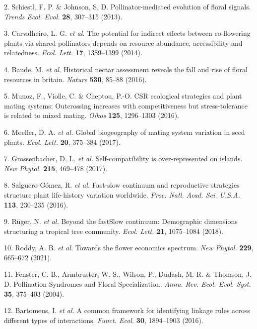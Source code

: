\documentclass[
  12pt,
  a4paper,
]{article}
\begin{document}
\leavevmode\hypertarget{ref-schiestl2013}{}%
2. Schiestl, F. P. \& Johnson, S. D. Pollinator-mediated evolution of floral signals. \emph{Trends Ecol. Evol.} \textbf{28}, 307--315 (2013).

\leavevmode\hypertarget{ref-carvalheiro2014}{}%
3. Carvalheiro, L. G. \emph{et al.} The potential for indirect effects between co-flowering plants via shared pollinators depends on resource abundance, accessibility and relatedness. \emph{Ecol. Lett.} \textbf{17}, 1389--1399 (2014).

\leavevmode\hypertarget{ref-baude2016}{}%
4. Baude, M. \emph{et al.} Historical nectar assessment reveals the fall and rise of floral resources in britain. \emph{Nature} \textbf{530}, 85--88 (2016).

\leavevmode\hypertarget{ref-munoz2016}{}%
5. Munoz, F., Violle, C. \& Cheptou, P.-O. CSR ecological strategies and plant mating systems: Outcrossing increases with competitiveness but stress-tolerance is related to mixed mating. \emph{Oikos} \textbf{125}, 1296--1303 (2016).

\leavevmode\hypertarget{ref-moeller2017}{}%
6. Moeller, D. A. \emph{et al.} Global biogeography of mating system variation in seed plants. \emph{Ecol. Lett.} \textbf{20}, 375--384 (2017).

\leavevmode\hypertarget{ref-grossenbacher2017}{}%
7. Grossenbacher, D. L. \emph{et al.} Self-compatibility is over-represented on islands. \emph{New Phytol.} \textbf{215}, 469--478 (2017).

\leavevmode\hypertarget{ref-salguero2016}{}%
8. Salguero-Gómez, R. \emph{et al.} Fast-slow continuum and reproductive strategies structure plant life-history variation worldwide. \emph{Proc. Natl. Acad. Sci. U.S.A.} \textbf{113}, 230--235 (2016).

\leavevmode\hypertarget{ref-ruger2018}{}%
9. Rüger, N. \emph{et al.} Beyond the fastSlow continuum: Demographic dimensions structuring a tropical tree community. \emph{Ecol. Lett.} \textbf{21}, 1075--1084 (2018).

\leavevmode\hypertarget{ref-roddy2021}{}%
10. Roddy, A. B. \emph{et al.} Towards the flower economics spectrum. \emph{New Phytol.} \textbf{229}, 665--672 (2021).

\leavevmode\hypertarget{ref-fenster2004}{}%
11. Fenster, C. B., Armbruster, W. S., Wilson, P., Dudash, M. R. \& Thomson, J. D. Pollination Syndromes and Floral Specialization. \emph{Annu. Rev. Ecol. Evol. Syst.} \textbf{35}, 375--403 (2004).

\leavevmode\hypertarget{ref-bartomeus2016}{}%
12. Bartomeus, I. \emph{et al.} A common framework for identifying linkage rules across different types of interactions. \emph{Funct. Ecol.} \textbf{30}, 1894--1903 (2016).
\end{document}
